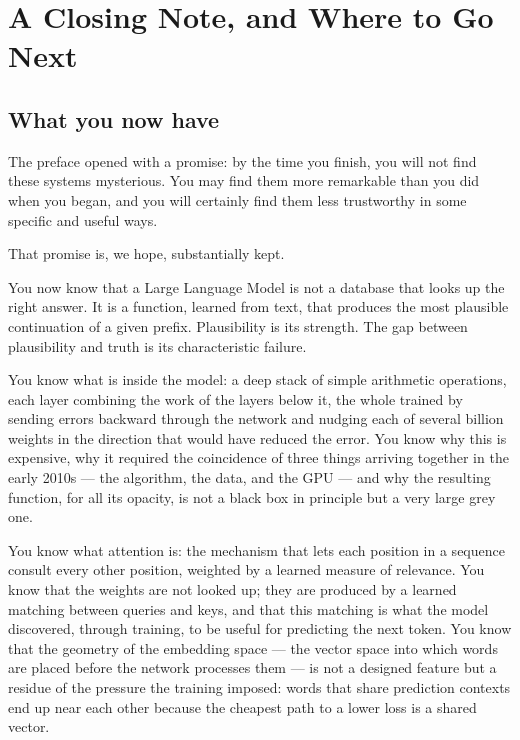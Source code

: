 
\chapter*{A Closing Note, and Where to Go Next}

\section*{What you now have}

The preface opened with a promise: by the time you finish,
you will not find these systems mysterious. You may find them
more remarkable than you did when you began, and you will
certainly find them less trustworthy in some specific and
useful ways.

That promise is, we hope, substantially kept.

You now know that a Large Language Model is not a database
that looks up the right answer. It is a function, learned
from text, that produces the most plausible continuation
of a given prefix. Plausibility is its strength. The gap
between plausibility and truth is its characteristic failure.

You know what is inside the model: a deep stack of simple
arithmetic operations, each layer combining the work of the
layers below it, the whole trained by sending errors
backward through the network and nudging each of several
billion weights in the direction that would have reduced
the error. You know why this is expensive, why it required
the coincidence of three things arriving together in the
early 2010s --- the algorithm, the data, and the GPU ---
and why the resulting function, for all its opacity, is
not a black box in principle but a very large grey one.

You know what attention is: the mechanism that lets each
position in a sequence consult every other position,
weighted by a learned measure of relevance. You know that
the weights are not looked up; they are produced by
a learned matching between queries and keys, and that this
matching is what the model discovered, through training,
to be useful for predicting the next token. You know that
the geometry of the embedding space --- the vector space
into which words are placed before the network processes
them --- is not a designed feature but a residue of the
pressure the training imposed: words that share prediction
contexts end up near each other because the cheapest path
to a lower loss is a shared vector.

